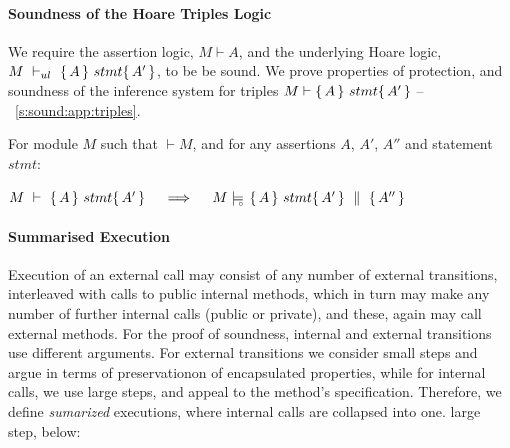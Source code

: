 
\paragraph{Soundness of the Hoare Triples Logic}
\label{sect:prove:triples:sound}

We require the assertion logic,  $M\vdash A$, and  the    underlying Hoare logic,  $M\ \vdash_{ul}\  \triple A {stmt} {A'}$,   to be be  sound. %
We   prove  properties of protection, and 
 soundness of the inference system for triples $M \vdash   \{\, A \, \}\ stmt \{\, A' \, \} $ -- \cf \A\ \ref{s:sound:app:triples}.

 

\begin{Theorem}
\label{l:triples:sound}
For module  $M$   such that  $\vdash M$, and for any assertions $A$,  $A'$, $A''$ and statement  $stmt$:
\begin{center}
$M\ \vdash\  \triple A {stmt} {A'}  \ \ \ \  \Longrightarrow  \ \ \ \ \satisfiesD {M} {\quadruple {A} {stmt} {A'} {A''}}$
\end{center}
\end{Theorem}
 

\paragraph{Summarised Execution}
\label{s:summaized}

Execution of an external call may consist of any number of external
transitions, interleaved with calls to public internal methods, which in
turn may make any number of further internal calls (public or private),  %
and these, again may call external methods.
For the   proof of soundness,  internal and external transitions use different arguments.
 For  external transitions we consider small steps  and  argue in terms of  preservationon of  encapsulated properties,
while for internal calls, we use large steps, and appeal to the method's specification.
Therefore, we define  \emph{sumarized} executions, where  internal calls are collapsed into one. large step, \eg below:
  

\label{sect:termExecs}



